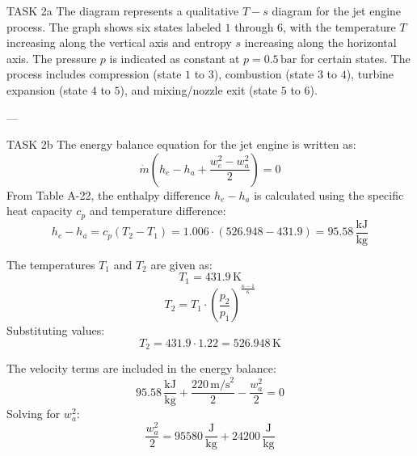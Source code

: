 TASK 2a  
The diagram represents a qualitative \( T-s \) diagram for the jet engine process. The graph shows six states labeled \( 1 \) through \( 6 \), with the temperature \( T \) increasing along the vertical axis and entropy \( s \) increasing along the horizontal axis. The pressure \( p \) is indicated as constant at \( p = 0.5 \, \text{bar} \) for certain states. The process includes compression (state \( 1 \) to \( 3 \)), combustion (state \( 3 \) to \( 4 \)), turbine expansion (state \( 4 \) to \( 5 \)), and mixing/nozzle exit (state \( 5 \) to \( 6 \)).  

---

TASK 2b  
The energy balance equation for the jet engine is written as:  
\[
\dot{m} \left( h_e - h_a + \frac{w_e^2 - w_a^2}{2} \right) = 0
\]  
From Table A-22, the enthalpy difference \( h_e - h_a \) is calculated using the specific heat capacity \( c_p \) and temperature difference:  
\[
h_e - h_a = c_p (T_2 - T_1) = 1.006 \cdot (526.948 - 431.9) = 95.58 \, \frac{\text{kJ}}{\text{kg}}
\]  

The temperatures \( T_1 \) and \( T_2 \) are given as:  
\[
T_1 = 431.9 \, \text{K}
\]  
\[
T_2 = T_1 \cdot \left( \frac{p_2}{p_1} \right)^{\frac{\kappa - 1}{\kappa}}
\]  
Substituting values:  
\[
T_2 = 431.9 \cdot 1.22 = 526.948 \, \text{K}
\]  

The velocity terms are included in the energy balance:  
\[
95.58 \, \frac{\text{kJ}}{\text{kg}} + \frac{220 \, \text{m/s}^2}{2} - \frac{w_a^2}{2} = 0
\]  
Solving for \( w_a^2 \):  
\[
\frac{w_a^2}{2} = 95580 \, \frac{\text{J}}{\text{kg}} + 24200 \, \frac{\text{J}}{\text{kg}}
\]